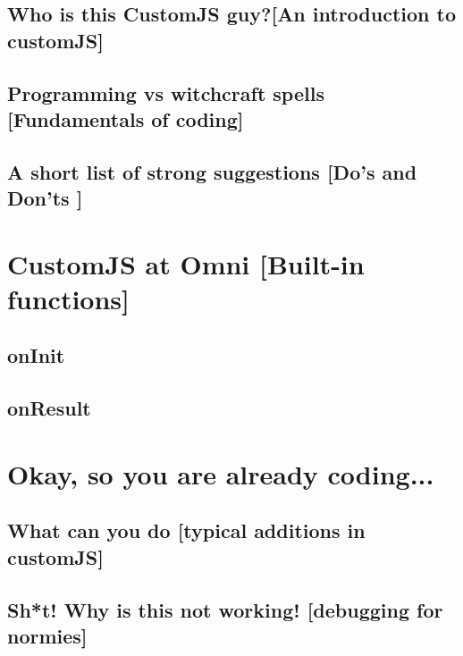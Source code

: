 \documentclass[11pt,a4paper,oldfontcommands]{memoir}
\begin{document}
    \section{Who is this CustomJS guy?\small[An introduction to customJS]}
        \label{sec:whatIs}
        
    
    
    
    \section{Programming vs witchcraft spells \small[Fundamentals of coding]}    
        \label{sec:fundamentals}
        
    
    \section{A short list of strong suggestions \small{[Do's and Don'ts ]}}
        \label{sec:suggestions}
        

\chapter{CustomJS at Omni \small{[Built-in functions]}}
    \label{chap:omni}
    
    \section{onInit}
    \label{sec:onInit}
    
    
    \section{onResult}
    \label{sec:onResult}
    

\chapter{Okay, so you are already coding...}
    \label{chap:coding}

    \section{What can you do \small{[typical additions in customJS]}}
    \label{sec:whatDo}
    
    
    \section{Sh*t! Why is this not working! \small{[debugging for normies]}}
    \label{sec:fix}
    
    
\end{document}
